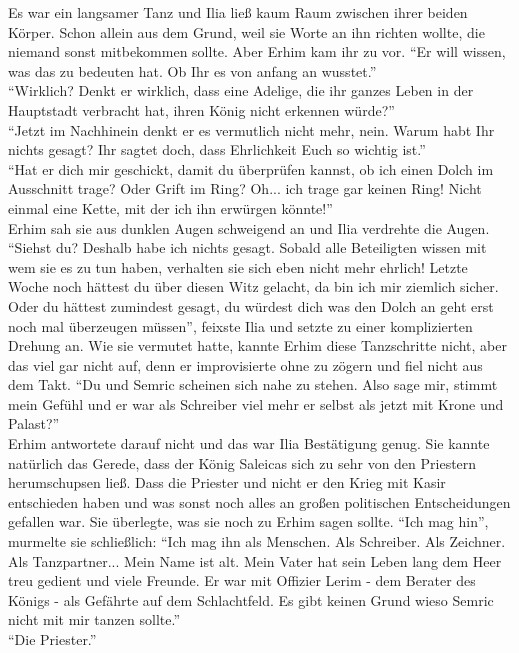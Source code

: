 Es war ein langsamer Tanz und Ilia ließ kaum Raum zwischen ihrer beiden Körper. Schon allein aus 
dem Grund, weil sie Worte an ihn richten wollte, die niemand sonst mitbekommen sollte. Aber Erhim 
kam ihr zu vor. ``Er will wissen, was das zu bedeuten hat. Ob Ihr es von anfang an wusstet.''\\
``Wirklich? Denkt er wirklich, dass eine Adelige, die ihr ganzes Leben in der Hauptstadt verbracht 
hat, ihren König nicht erkennen würde?''\\
``Jetzt im Nachhinein denkt er es vermutlich nicht mehr, nein. Warum habt Ihr nichts gesagt? Ihr 
sagtet doch, dass Ehrlichkeit Euch so wichtig ist.''\\
``Hat er dich mir geschickt, damit du überprüfen kannst, ob ich einen Dolch im Ausschnitt trage? 
Oder Grift im Ring? Oh... ich trage gar keinen Ring! Nicht einmal eine Kette, mit der ich ihn 
erwürgen könnte!''\\
Erhim sah sie aus dunklen Augen schweigend an und Ilia verdrehte die Augen. ``Siehst du? Deshalb 
habe ich nichts gesagt. Sobald alle Beteiligten wissen mit wem sie es zu tun haben, verhalten sie 
sich eben nicht mehr ehrlich! Letzte Woche noch hättest du über diesen Witz gelacht, da bin ich mir 
ziemlich sicher. Oder du hättest zumindest gesagt, du würdest dich was den Dolch an geht erst noch 
mal überzeugen müssen'', feixste Ilia und setzte zu einer komplizierten Drehung an. Wie sie 
vermutet hatte, kannte Erhim diese Tanzschritte nicht, aber das viel gar nicht auf, denn er 
improvisierte ohne zu zögern und fiel nicht aus dem Takt. ``Du und Semric scheinen sich nahe zu 
stehen. Also sage mir, stimmt mein Gefühl und er war als Schreiber viel mehr er selbst als 
jetzt mit Krone und Palast?''\\
Erhim antwortete darauf nicht und das war Ilia Bestätigung genug. Sie kannte natürlich das Gerede, 
dass der König Saleicas sich zu sehr von den Priestern herumschupsen ließ. Dass die Priester und 
nicht er den Krieg mit Kasir entschieden haben und was sonst noch alles an großen politischen 
Entscheidungen gefallen war. Sie überlegte, was sie noch zu Erhim sagen sollte. ``Ich mag hin'', 
murmelte sie schließlich: ``Ich mag ihn als Menschen. Als Schreiber. Als Zeichner. Als 
Tanzpartner... Mein Name ist alt. Mein Vater hat sein Leben lang dem Heer treu 
gedient und viele Freunde. Er war mit Offizier Lerim - dem Berater des Königs - als Gefährte auf 
dem Schlachtfeld. Es gibt keinen Grund wieso Semric nicht mit mir tanzen sollte.''\\
``Die Priester.''\\
